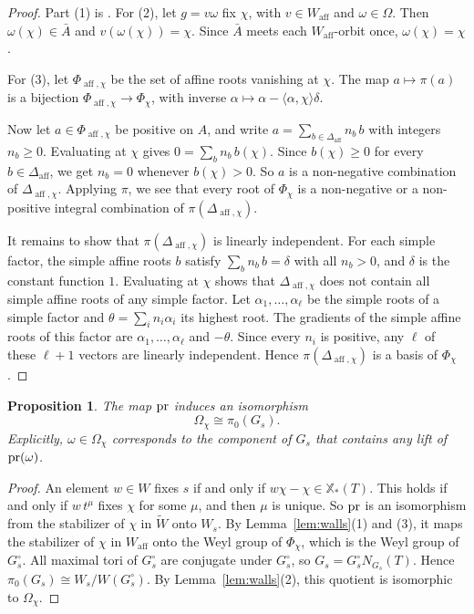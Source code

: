 \documentclass[psamsfonts]{amsart}
\newtheorem{prop}[thm]{Proposition}
\theoremstyle{definition}
\theoremstyle{remark}
\numberwithin{equation}{section}
\newcommand{\X}{\mathbb{X}}
\newcommand{\extw}{\widetilde{W}}
\newcommand{\ra}{\rightarrow}
\DeclareMathOperator{\aff}{aff}
\numberwithin{equation}{section}
\newcommand{\om}{\omega}
\newcommand{\Om}{\Omega}
\newcommand\Wa{W_{\aff}}
\newcommand\pr{\textup{pr}}
\newcommand{\Daff}{\Delta_{\aff}}
\theoremstyle{plain}
\begin{document}
\begin{proof}
Part (1) is \cite[Chapter~V, \S3.3, Proposition~1]{Bou02}. For (2), let $g=v\om$ fix $\chi$, with $v\in\Wa$ and $\om\in\Om$. Then $\om(\chi)\in\bar A$ and $v(\om(\chi))=\chi$. Since $\bar A$ meets each $\Wa$-orbit once, $\om(\chi)=\chi$.

For (3), let $\Phi_{\aff,\chi}$ be the set of affine roots vanishing at $\chi$. The map $a\mapsto\pi(a)$ is a bijection $\Phi_{\aff,\chi}\ra\Phi_\chi$, with inverse $\alpha\mapsto\alpha-\langle\alpha,\chi\rangle\delta$.

Now let $a\in\Phi_{\aff,\chi}$ be positive on $A$, and write $a=\sum_{b\in\Daff}n_b\,b$ with integers $n_b\geq0$. Evaluating at $\chi$ gives $0=\sum_bn_b\,b(\chi)$. Since $b(\chi)\geq0$ for every $b\in\Daff$, we get $n_b=0$ whenever $b(\chi)>0$. So $a$ is a non-negative combination of $\Delta_{\aff,\chi}$. Applying $\pi$, we see that every root of $\Phi_\chi$ is a non-negative or a non-positive integral combination of $\pi(\Delta_{\aff,\chi})$.

It remains to show that $\pi(\Delta_{\aff,\chi})$ is linearly independent. For each simple factor, the simple affine roots $b$ satisfy $\sum_bn_b\,b=\delta$ with all $n_b>0$, and $\delta$ is the constant function $1$. Evaluating at $\chi$ shows that $\Delta_{\aff,\chi}$ does not contain all simple affine roots of any simple factor. Let $\alpha_1,\dots,\alpha_\ell$ be the simple roots of a simple factor and $\theta=\sum_in_i\alpha_i$ its highest root. The gradients of the simple affine roots of this factor are $\alpha_1,\dots,\alpha_\ell$ and $-\theta$. Since every $n_i$ is positive, any $\ell$ of these $\ell+1$ vectors are linearly independent. Hence $\pi(\Delta_{\aff,\chi})$ is a basis of $\Phi_\chi$.
\end{proof}

\begin{prop}\label{prop:pi0}
The map $\pr$ induces an isomorphism
\[
\Om_\chi\cong\pi_0(G_s).
\]
Explicitly, $\om\in\Om_\chi$ corresponds to the component of $G_s$ that contains any lift of $\pr(\om)$.
\end{prop}

\begin{proof}
An element $w\in W$ fixes $s$ if and only if $w\chi-\chi\in\X_*(T)$. This holds if and only if $w\,t^{\mu}$ fixes $\chi$ for some $\mu$, and then $\mu$ is unique. So $\pr$ is an isomorphism from the stabilizer of $\chi$ in $\extw$ onto $W_s$.
By Lemma~\ref{lem:walls}(1) and (3), it maps the stabilizer of $\chi$ in $\Wa$ onto the Weyl group of $\Phi_\chi$, which is the Weyl group of $G_s^{\circ}$. All maximal tori of $G_s^{\circ}$ are conjugate under $G_s^{\circ}$, so $G_s=G_s^{\circ}N_{G_s}(T)$. Hence $\pi_0(G_s)\cong W_s/W(G_s^{\circ})$. By Lemma~\ref{lem:walls}(2), this quotient is isomorphic to $\Om_\chi$.
\end{proof}
\end{document}

